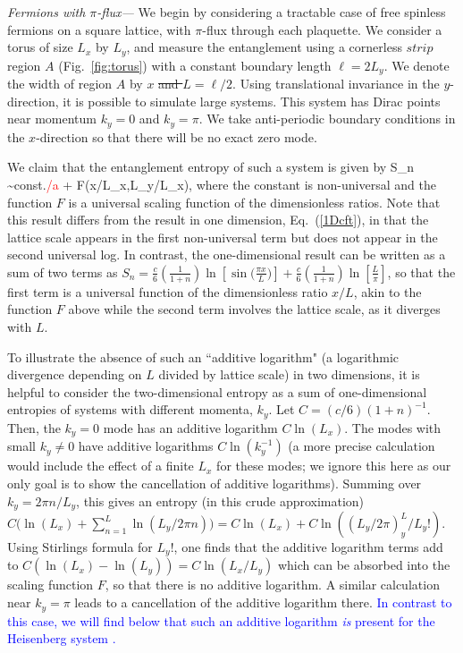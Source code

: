 \documentclass[prl,aps,twocolumn,floatfix,amsmath,amssymb,superscriptaddress,tightenlines]{revtex4}
\begin{document}
{\it Fermions with $\pi$-flux---}
We begin by considering a tractable case of
free spinless fermions on a square lattice, with $\pi$-flux through each plaquette.  We consider a torus of size $L_x$ by $L_y$, and
measure the entanglement %
using a cornerless $strip$ region $A$ (Fig.~\ref{fig:torus}) with a constant boundary length $\ell = 2L_y$.
We denote the width of region $A$ by $x$ \sout{and $L = \ell/2$}.
Using translational invariance in the $y$-direction, it is possible to simulate large systems.  This system has Dirac points near momentum $k_y=0$ and $k_y=\pi$.  We take anti-periodic boundary conditions in the $x$-direction so that there will be no exact zero mode.

We claim that the entanglement entropy of such a system is given by
\be
S_n \sim {\rm const.}\times \ell\textcolor{red}{/a} + F(x/L_x,L_y/L_x),
\ee
where the constant is non-universal and the function $F$ is a universal scaling function of the dimensionless ratios.  Note that this result differs
from the result in one dimension, Eq.~(\ref{1Dcft}), in that the lattice scale appears in the first non-universal term but does not appear in the second universal log.  In contrast, the one-dimensional result can be written as a sum of two terms as
$S_n = \frac{c}{6}\left({ \frac{1}{1+n} }\right) \ln[\sin\big( \frac{\pi x}{L} \big)]+\frac{c}{6}\left(\frac{1}{1+n}\right)\ln[\frac{L}{\pi}]$, so that the first term is a universal function of the dimensionless ratio $x/L$, akin to the function $F$ above while the second term involves the lattice scale, as it diverges with $L$.

To illustrate the absence of such an ``additive logarithm" (a logarithmic divergence depending on $L$ divided by lattice scale) in two dimensions, it is helpful to 
consider the two-dimensional entropy as a sum of one-dimensional entropies of systems with different momenta, $k_y$.  Let $C=(c/6)(1+n)^{-1}$.  Then, the $k_y=0$ mode has an additive logarithm $C \ln(L_x)$.  The modes with small $k_y \neq 0$ have additive logarithms $C \ln(k_y^{-1})$ (a more precise calculation would include the effect of a finite $L_x$ for these modes; we ignore this here as our only goal is to show the cancellation of additive logarithms).  Summing over $k_y=2\pi n/L_y$, this gives an entropy (in this crude approximation) $C \big( \ln(L_x)+\sum_{n=1}^{L} \ln(L_y/2 \pi n) \big)=C\ln(L_x) + C\ln((L_y/2\pi)^L_y/L_y!)$.  Using Stirlings formula for $L_y!$, one finds that the additive logarithm terms add to $C(\ln(L_x)-\ln(L_y))=C\ln(L_x/L_y)$ which can be absorbed into the scaling function $F$, so that there is no additive logarithm.  A similar calculation near $k_y=\pi$ leads to a cancellation of the additive logarithm there.
\textcolor{blue}{In contrast to this case, we will find below that such an additive logarithm {\it is} present for the Heisenberg system \cite{HeisLog}.}
\end{document}

